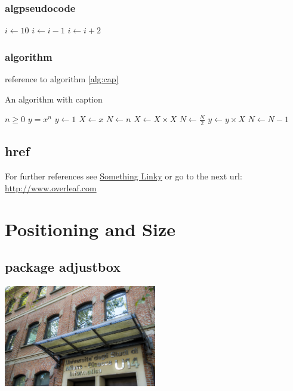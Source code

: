 \documentclass[a4paper, oneside]{book}
\begin{document}
\subsection{algpseudocode}
\begin{algorithmic}
\State $i \gets 10$
    \State $i \gets i-1$
\Else
        \State $i \gets i+2$
    \EndIf
\EndIf 
\end{algorithmic}

\subsection{algorithm}

reference to algorithm \ref{alg:cap}
\begin{algorithm}[!h]
\caption{An algorithm with caption}\label{alg:cap}
\begin{algorithmic}
\Require $n \geq 0$
\Ensure $y = x^n$
\State $y \gets 1$
\State $X \gets x$
\State $N \gets n$
    \State $X \gets X \times X$
    \State $N \gets \frac{N}{2}$  
    \State $y \gets y \times X$
    \State $N \gets N - 1$
\EndIf
\EndWhile
\end{algorithmic}
\end{algorithm}

\section{href}
For further references see \href{http://www.overleaf.com}{Something Linky} 
or go to the next url: \url{http://www.overleaf.com}

\chapter{Positioning and Size}

\section{package adjustbox}
\includegraphics[width=0.5\textwidth, right]{u14.jpg}
\end{document}
